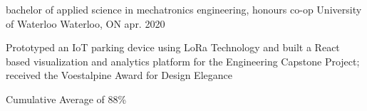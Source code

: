 
\begin{cventries}
  \cventry
    {bachelor of applied science in mechatronics engineering, honours co-op} %
    {University of Waterloo} %
    {Waterloo, ON} %
    {apr. 2020} %
    {
      \begin{cvitems} %
          \vspace{1.0mm}
          \item {Prototyped an IoT parking device using LoRa Technology and built a React based visualization and analytics platform for the Engineering Capstone Project; received the Voestalpine Award for Design Elegance}
          \vspace{1.0mm}
          \item {Cumulative Average of 88\%}
      \end{cvitems}
    }
\end{cventries}

